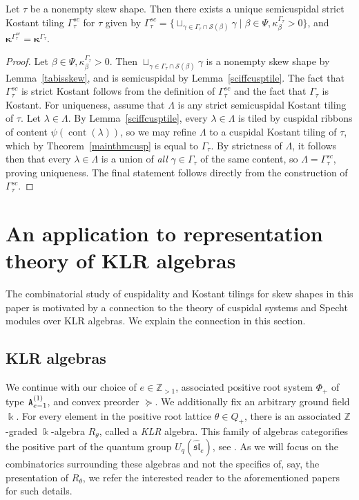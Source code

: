 \documentclass[Unicode,ALCO]{cedram}
\newcommand{\Z}{\mathbb{Z}}
\newcommand{\SSSS}{\mathcal{S}}
\newcommand{\0}{{\bar 0}}
\newcommand{\ZZ}{{\mathbb Z}}
\newcommand{\bkap}{\boldsymbol{\kappa}}
\def\cont{{\operatorname{cont}}}
\def\k{\Bbbk}
\begin{document}
\begin{theorem}\label{mainthmscKost}
Let \(\tau\) be a nonempty skew shape. Then
there exists a unique semicuspidal strict Kostant tiling \(\Gamma_\tau^{sc}\) for \(\tau\) given by \(\Gamma_\tau^{sc} = \{\sqcup_{\gamma \in \Gamma_\tau \cap \SSSS(\beta)}\gamma \mid \beta \in \Psi, \kappa^{\Gamma_\tau}_\beta >0\}\), and \(\bkap^{\Gamma_\tau^{sc}} = \bkap^{\Gamma_\tau}\).
\end{theorem}
\begin{proof}
Let \(\beta \in \Psi, \kappa^{\Gamma_\tau}_\beta >0\). Then \(\sqcup_{\gamma \in \Gamma_\tau \cap \SSSS(\beta)}\gamma\) is a nonempty skew shape by Lemma~\ref{tabisskew}, and is semicuspidal by Lemma~\ref{sciffcusptile}. The fact that \(\Gamma_\tau^{sc}\) is strict Kostant follows from the definition of \(\Gamma_\tau^{sc}\) and the fact that \(\Gamma_\tau\) is Kostant. For uniqueness, assume that \(\Lambda\) is any strict semicuspidal Kostant tiling of \(\tau\). Let \(\lambda \in \Lambda\). By Lemma~\ref{sciffcusptile}, every \(\lambda \in \Lambda\) is tiled by cuspidal ribbons of content \(\psi(\cont(\lambda))\), so we may refine \(\Lambda\) to a cuspidal Kostant tiling of \(\tau\), which by Theorem~\ref{mainthmcusp} is equal to \(\Gamma_\tau\). By strictness of \(\Lambda\), it follows then that every \(\lambda \in \Lambda\) is a union of {\em all} \(\gamma \in \Gamma_\tau\) of the same content, so \(\Lambda = \Gamma_\tau^{sc}\), proving uniqueness. The final statement follows directly from the construction of \(\Gamma_\tau^{sc}\).
\end{proof}

\section{An application to representation theory of KLR algebras}\label{appSpecht}
The combinatorial study of cuspidality and Kostant tilings for skew shapes in this paper is motivated by a connection to the theory of cuspidal systems and Specht modules over KLR algebras. We explain the connection in this section.

\subsection{KLR algebras}
We continue with our choice of \(e \in \Z_{>1}\), associated positive root system \(\Phi_+\) of type \({\tt A}^{(1)}_{e-1}\), and convex preorder \(\succeq\). We additionally fix an arbitrary ground field \(\k\).
For every element in the positive root lattice \(\theta \in Q_+\), there is an associated \(\ZZ\)-graded \(\k\)-algebra \(R_\theta\), called a {\em KLR} algebra. This family of algebras categorifies the positive part of the quantum group \(U_q(\widehat{\mathfrak{sl}}_e)\), see \cite{KhoLauDiagCat1, KhoLauDiagCat2, Rouq2KM}. As we will focus on the combinatorics surrounding these algebras and not the specifics of, say, the presentation of \(R_\theta\), we refer the interested reader to the aforementioned papers for such details.
\end{document}
